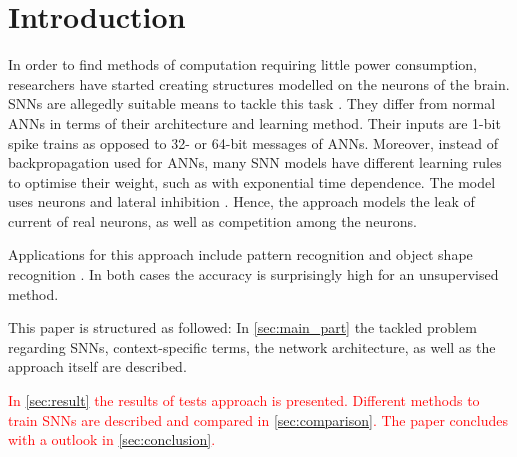 \section{Introduction}

In order to find methods of computation requiring little power consumption, 
researchers have started creating structures modelled on the neurons of the brain.
\acp{SNN} are allegedly suitable means to tackle this task \cite{SNN}.
They differ from normal \acp{ANN} in terms of their architecture and learning method.
Their inputs are 1-bit spike trains as opposed to 32- or 64-bit messages of \acp{ANN}.
Moreover, instead of backpropagation used for \acp{ANN}, many \ac{SNN} models have different learning rules to optimise their weight, 
such as  with exponential time dependence.
The model uses  neurons and lateral inhibition \cite{SNN}.
Hence, the approach models the leak of current of real neurons, as well as competition among the neurons.

Applications for this approach include pattern recognition \cite{SNN} and object shape recognition \cite{object_detection_SNN}.
In both cases the accuracy is surprisingly high for an unsupervised method.

This paper is structured as followed:
In \autoref{sec:main_part} the tackled problem regarding \acp{SNN}, context-specific terms, the network architecture,
 as well as the approach itself are described.

\textcolor{red}{
In \autoref{sec:result} the results of tests approach is presented.
Different methods to train \acp{SNN} are described and compared in \autoref{sec:comparison}.
The paper concludes with a outlook in \autoref{sec:conclusion}.}